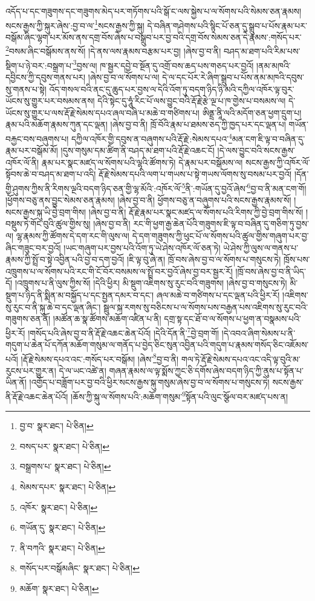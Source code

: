 འདོད་པ་དང་གཟུགས་དང་གཟུགས་མེད་པར་གཏོགས་པའི་སྒོ་ང་ལས་སྐྱེས་པ་ལ་སོགས་པའི་སེམས་ཅན་རྣམས། སངས་རྒྱས་ཀྱི་སྐུར་ཞེས་:བྱ་བ་ལ་\footnote{བྱ་བ་  སྣར་ཐང་།  པེ་ཅིན། }སངས་རྒྱས་ཀྱི་སྐུ། དེ་བཞིན་གཤེགས་པའི་སྙིང་པོ་ཅན་དུ་སྒྲུབ་པ་པོས་རྣམ་པར་བསྒོམ་ཞིང་ལྷག་པར་མོས་ནས་དགྲ་བོས་ཞེས་པ་བསྒྲུབ་པར་བྱ་བའི་དགྲ་བོས་སེམས་ཅན་དེ་རྣམས་:གསོད་པར་\footnote{བསད་པར་  སྣར་ཐང་།  པེ་ཅིན། }བསམ་ཞིང་བསྒོམས་ནས་སོ། །དེ་ནས་ལས་རྣམས་བརྩམ་པར་བྱ། །ཞེས་བྱ་བ་ནི། བཤད་མ་ཐག་པའི་རིམ་པས་སྡིག་པ་ཉེ་བར་:བསྒྲག་པ་\footnote{བསྒྲགས་པ་  སྣར་ཐང་།  པེ་ཅིན། }བྱས་ལ། ཁ་སྦྱར་དབྱེ་བ་སྔོན་དུ་འགྲོ་བས་ཆད་པས་གཅད་པར་བྱའོ། །ནམ་མཁའི་དབྱིངས་ཀྱི་དབུས་གནས་པར། །ཞེས་བྱ་བ་ལ་སོགས་པ་ལ། དེ་ལ་དང་པོར་རེ་ཞིག་སྒྲུབ་པ་པོས་ནམ་མཁའི་དབུས་སུ་གནས་པ་སྟེ། འོད་གསལ་བའི་ནང་དུ་ཆུད་པར་བྱས་ལ་དེའི་འོག་ཏུ་བདག་ཉིད་ཉི་མའི་དཀྱིལ་འཁོར་ལྟ་བུར་ཡོངས་སུ་གྱུར་པར་བསམས་ནས། དེའི་སྟེང་དུ་ཧཱུཾ་རིང་པོ་ལས་བྱུང་བའི་རྡོ་རྗེ་རྩེ་ལྔ་པ་ཁ་གྱེས་པ་བསམས་ལ། དེ་ཡོངས་སུ་གྱུར་པ་ལས་རྡོ་རྗེ་སེམས་དཔའ་ཞལ་བཞི་པ་མཆེ་བ་གཙིགས་པ། ཨིནྡྲ་ནཱི་ལའི་མདོག་ཅན་ཕྱག་དྲུག་པ། རྣམ་པའི་མཆོག་རྣམས་ཀུན་དང་ལྡན། །ཞེས་བྱ་བ་ནི། ཁྲོ་བོའི་རྣམ་པ་ཐམས་ཅད་ཀྱི་ཁྱད་པར་དང་ལྡན་པ། གཡོན་བརྐྱང་བས་བཞུགས་པ། དཀྱིལ་འཁོར་གྱི་དབུས་ན་བཞུགས་པའི་རྡོ་རྗེ་:སེམས་དཔའ་\footnote{སེམས་དཔར་  སྣར་ཐང་།  པེ་ཅིན། }མན་ངག་ཇི་ལྟ་བ་བཞིན་དུ་རྣམ་པར་བསྒོམ་མོ། །དུས་གསུམ་དམ་ཚིག་ནི་བཤད་མ་ཐག་པའི་རྡོ་རྗེ་འཆང་ངོ། །དེ་ལས་བྱུང་བའི་སངས་རྒྱས་འཁོར་ལོ་ནི། རྣམ་པར་སྣང་མཛད་ལ་སོགས་པའི་ལྷའི་ཚོགས་ཏེ། དེ་རྣམ་པར་བསྒོམས་ལ། སངས་རྒྱས་ཀྱི་འཁོར་ལོ་སྟོབས་ཆེ་བ་བཤད་མ་ཐག་པ་འདི། རྡོ་རྗེ་སེམས་དཔའི་ལག་པ་གཡས་པ་སྟེ་གཡས་ལོགས་སུ་བསམ་པར་བྱའོ། །དོན་གྱི་ཤུགས་ཀྱིས་ནི་རིགས་ལྔའི་བདག་ཉིད་ཅན་གྱི་ལྷ་མོའི་:འཁོར་ལོ་\footnote{འཁོར་  སྣར་ཐང་།  པེ་ཅིན། }ནི་:གཡོན་དུ་བྱའོ་ཞེས་\footnote{གཡོན་དུ་  སྣར་ཐང་།  པེ་ཅིན། }བྱ་བ་ནི་མན་ངག་གོ། །ཕྱོགས་བཅུ་ནས་བྱུང་སེམས་ཅན་རྣམས། །ཞེས་བྱ་བ་ནི། ཕྱོགས་བཅུ་ན་བཞུགས་པའི་སངས་རྒྱས་རྣམས་སོ། །སངས་རྒྱས་སྐུ་ཡི་བྱེ་བྲག་གིས། །ཞེས་བྱ་བ་ནི། རྡོ་རྗེ་རྣམ་པར་སྣང་མཛད་ལ་སོགས་པའི་རིགས་ཀྱི་བྱེ་བྲག་གིས་སོ། །བསྡུས་ཏེ་གོང་བུའི་ཚུལ་གྱིས་སུ། །ཞེས་བྱ་བ་ནི། རང་གི་ཕྱག་རྒྱ་ཆེན་པོའི་གཟུགས་ཇི་ལྟ་བ་བཞིན་དུ་གཅིག་ཏུ་བྱས་ལ། ལྷ་རྣམས་ཀྱི་ཚོགས་དེ་དག་རང་གི་ལུས་ལ། དེ་དག་གཟུགས་ཀྱི་ཕུང་པོ་ལ་སོགས་པའི་ཚུལ་གྱིས་གཞུག་པར་བྱ་ཞིང་གཟུང་བར་བྱའོ། །ཡང་གཞུག་པར་བྱས་པའི་འོག་ཏུ་ཡེ་ཤེས་འཁོར་ལོ་ཅན་ཏེ། ཡེ་ཤེས་ཀྱི་ལུས་ལ་གནས་པ་རྣམས་ཀྱི་སྤྲོ་བ་སྟེ་འབྱིན་པའི་བྱ་བ་དག་བྱའོ། །ཇི་ལྟ་བུ་ཞེ་ན། ཁྲོ་བས་ཞེས་བྱ་བ་ལ་སོགས་པ་གསུངས་ཏེ། ཁྲོས་པས་འཁྲུགས་པ་ལ་སོགས་པའི་རང་གི་ངོ་བོར་བསམས་ལ་སྤྲོ་བར་བྱའོ་ཞེས་བྱ་བར་སྦྱར་རོ། །ཁྲོ་བས་ཞེས་བྱ་བ་ནི་ཡིད་དོ། །འཁྲུགས་པ་ནི་ལུས་ཀྱིས་སོ། །དེའི་ཕྱིར། མི་སྡུག་འཇིགས་སུ་རུང་བའི་གཟུགས། །ཞེས་བྱ་བ་གསུངས་ཏེ། མི་སྡུག་པ་ཉིད་ནི་སྨིན་མ་བསྐྱོད་པ་དང་སྤྱན་དམར་བ་དང་། ཞལ་མཆེ་བ་གཙིགས་པ་དང་ལྡན་པའི་ཕྱིར་རོ། །འཇིགས་སུ་རུང་བ་ནི་སྐུ་ཆེ་བ་དང་ལྡན་ཞིང་། སྦྲུལ་སྐ་རགས་སུ་བཅིངས་པ་ལ་སོགས་པས་བརྒྱན་པས་འཇིགས་སུ་རུང་བའི་གཟུགས་ཅན་ནོ། །མཚོན་ཆ་སྣ་ཚོགས་མཆོག་འཛིན་པ་ནི། དགྲ་སྟ་དང་ཐོ་བ་ལ་སོགས་པ་ཕྱག་ན་བསྣམས་པའི་ཕྱིར་རོ། །གསོད་པའི་ཞེས་བྱ་བ་ནི་རྡོ་རྗེ་འཆང་ཆེན་པོའོ། །དེའི་དོན་ནི་\footnote{ནི་བཀའི་  སྣར་ཐང་།  པེ་ཅིན། }བྱེ་བྲག་གོ། །དེ་འབའ་ཞིག་སེམས་པ་ནི་གདུག་པ་ཆེན་པོ་དཀོན་མཆོག་གསུམ་ལ་གནོད་པ་བྱེད་ཅིང་སུན་འབྱིན་པའི་གདུག་པ་རྣམས་གསོད་ཅིང་འཇོམས་པའོ། །རྡོ་རྗེ་སེམས་དཔའ་འང་:གསོད་པར་བསྒོམ། །ཞེས་\footnote{གསོད་པར་བསྒོམཞིང་  སྣར་ཐང་།  པེ་ཅིན། }བྱ་བ་ནི། གལ་ཏེ་རྡོ་རྗེ་སེམས་དཔའ་འང་འདི་ལྟ་བུའི་མ་རུངས་པར་གྱུར་ན། དེ་ལ་ཡང་འཚེ་ན། གཞན་རྣམས་ལ་ལྟ་སྨོས་ཀྱང་ཅི་དགོས་ཞེས་བདག་ཉིད་ཀྱི་ནུས་པ་སྟོན་པ་ཡིན་ནོ། །འགྱོད་པ་བཟློག་པར་བྱ་བའི་ཕྱིར་སངས་རྒྱས་སྐུ་གསུམ་ཞེས་བྱ་བ་ལ་སོགས་པ་གསུངས་ཏེ། སངས་རྒྱས་ནི་རྡོ་རྗེ་འཆང་ཆེན་པོའོ། །ཆོས་ཀྱི་སྐུ་ལ་སོགས་པའི་:མཆོག་གསུམ་\footnote{མཆོག་  སྣར་ཐང་།  པེ་ཅིན། }སྟོན་པའི་ལུང་སྩོལ་བར་མཛད་པས་ན། 